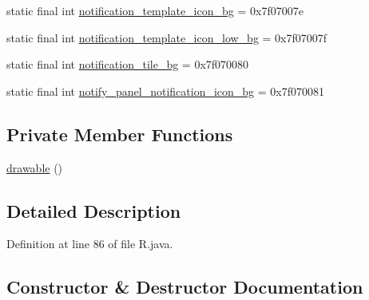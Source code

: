 \begin{DoxyCompactItemize}
\item 
static final int \mbox{\hyperlink{classandroid_1_1support_1_1v7_1_1recyclerview_1_1_r_1_1drawable_a309b0025cdcb1c55708e4b85495cbc89}{notification\+\_\+template\+\_\+icon\+\_\+bg}} = 0x7f07007e
\item 
static final int \mbox{\hyperlink{classandroid_1_1support_1_1v7_1_1recyclerview_1_1_r_1_1drawable_a48c70131cea06dedb4af85e7ec783ed5}{notification\+\_\+template\+\_\+icon\+\_\+low\+\_\+bg}} = 0x7f07007f
\item 
static final int \mbox{\hyperlink{classandroid_1_1support_1_1v7_1_1recyclerview_1_1_r_1_1drawable_ab1a5b89b74498f702bf36c86091b1865}{notification\+\_\+tile\+\_\+bg}} = 0x7f070080
\item 
static final int \mbox{\hyperlink{classandroid_1_1support_1_1v7_1_1recyclerview_1_1_r_1_1drawable_a74df627da5b232a7f838aa3fa672c043}{notify\+\_\+panel\+\_\+notification\+\_\+icon\+\_\+bg}} = 0x7f070081
\end{DoxyCompactItemize}
\subsection*{Private Member Functions}
\begin{DoxyCompactItemize}
\item 
\mbox{\hyperlink{classandroid_1_1support_1_1v7_1_1recyclerview_1_1_r_1_1drawable_ae8de2eb116e0c0ce51f58798ed5ee7e6}{drawable}} ()
\end{DoxyCompactItemize}


\subsection{Detailed Description}


Definition at line 86 of file R.\+java.



\subsection{Constructor \& Destructor Documentation}
\mbox{\label{classandroid_1_1support_1_1v7_1_1recyclerview_1_1_r_1_1drawable_ae8de2eb116e0c0ce51f58798ed5ee7e6}} 
